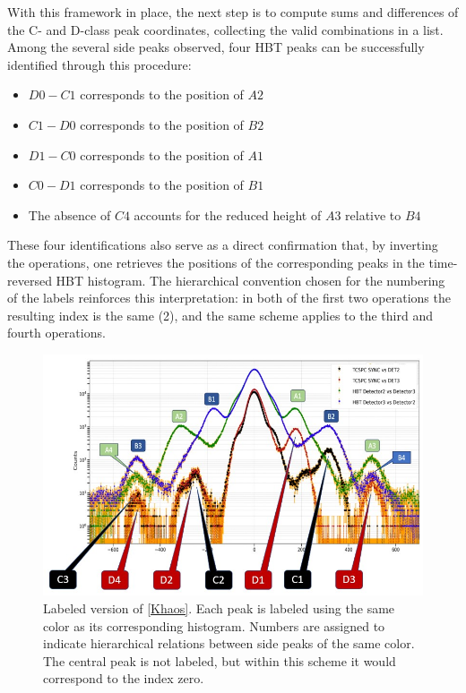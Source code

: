 With this framework in place, the next step is to compute sums and differences of the C- and D-class peak coordinates, collecting the valid combinations in a list.
Among the several side peaks observed, four HBT peaks can be successfully identified through this procedure:
\begin{itemize}
\item $D0 - C1$ corresponds to the position of $A2$
\item $C1 - D0$ corresponds to the position of $B2$
\item $D1 - C0$ corresponds to the position of $A1$
\item $C0 - D1$ corresponds to the position of $B1$
\item The absence of $C4$ accounts for the reduced height of $A3$ relative to $B4$
\end{itemize}
These four identifications also serve as a direct confirmation that, by inverting the operations, one retrieves the positions of the corresponding peaks in the time-reversed HBT histogram. The hierarchical convention chosen for the numbering of the labels reinforces this interpretation: in both of the first two operations the resulting index is the same (2), and the same scheme applies to the third and fourth operations.



\begin{figure}[hbtp]
\centering
\includegraphics[width=1\textwidth]{Khaos_Labeled.jpg}
\caption{Labeled version of \autoref{Khaos}. Each peak is labeled using the same color as its corresponding histogram. Numbers are assigned to indicate hierarchical relations between side peaks of the same color. The central peak is not labeled, but within this scheme it would correspond to the index zero.}
\label{Khaos_labeled}
\end{figure}


